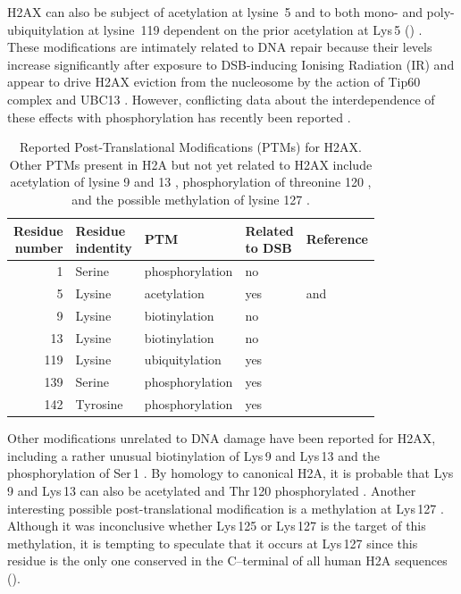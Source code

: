 H2AX can also be subject of acetylation at lysine~5 \citep{PB81} and
to both mono- and poly-ubiquitylation at lysine~119 dependent on the
prior acetylation at Lys\,5 ()
\citep{ITK+07}. These modifications are intimately related to DNA
repair because their levels increase significantly after exposure to
DSB-inducing Ionising Radiation (IR) and appear to drive H2AX eviction
from the nucleosome by the action of Tip60 complex and UBC13
\citep{ITK+07}. However, conflicting data about the interdependence of
these effects with phosphorylation has recently been reported
\citep{RVD+09}.

\begin{table}
\centering
\caption[Reported Post-Translational Modifications (PTMs) for H2AX]%
        {Reported Post-Translational Modifications (PTMs) for
          H2AX\@. Other PTMs present in H2A but not yet related to
          H2AX include acetylation of lysine 9 and 13 \citep{ZEP+03},
          phosphorylation of threonine 120 \citep{ANY+04}, and the
          possible methylation of lysine 127 \citep{ZEP+03}.}
\label{tab:h2ax-review:H2AX-PTM}
\begin{tabularx}{\linewidth}{r l l l >{\raggedright\arraybackslash}X}
\toprule
\makecell{Residue\\number} & \makecell{Residue\\indentity} & PTM & \makecell{Related\\to DSB} & Reference  \\
\midrule
1   & Serine & phosphorylation & no  & \citet{PB81} \\
5   & Lysine    & acetylation     & yes & \citet{PB81} and \citet{ITK+07} \\
9   & Lysine    & biotinylation   & no  & \citet{CCK+06} \\
13  & Lysine   & biotinylation   & no  & \citet{CCK+06} \\
119 & Lysine  & ubiquitylation  & yes & \citet{ITK+07} \\
139 & Serine  & phosphorylation & yes & \citet{EPR+98} \\
142 & Tyrosine  & phosphorylation & yes & \citet{XLS+09} \\
\bottomrule
\end{tabularx}
\end{table}

Other modifications unrelated to DNA damage have been reported for
H2AX, including a rather unusual biotinylation of Lys\,9 and Lys\,13
\citep{CCK+06} and the phosphorylation of Ser\,1 \citep{PB81}. By
homology to canonical H2A, it is probable that Lys\,9 and Lys\,13 can
also be acetylated \citep{ZEP+03} and Thr\,120 phosphorylated
\citep{ANY+04}. Another interesting possible post-translational
modification is a methylation at Lys\,127 \citep{ZEP+03}. Although it
was inconclusive whether Lys\,125 or Lys\,127 is the target of this
methylation, it is tempting to speculate that it occurs at Lys\,127
since this residue is the only one conserved in the C--terminal of all
human H2A sequences ().

